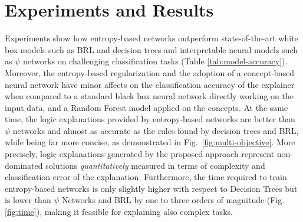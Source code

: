 \documentclass[withindex,glossary]{cam-thesis}
\theoremstyle{plain}
\theoremstyle{definition}
\theoremstyle{remark}
\begin{document}
\section{Experiments and Results}

Experiments show how entropy-based networks outperform state-of-the-art white box models such as BRL and decision trees
and interpretable neural models such as $\psi$ networks on challenging classification tasks (Table \ref{tab:model-accuracy}). 
Moreover, the entropy-based regularization and the adoption of a concept-based neural network have minor affects on the classification accuracy of the explainer when compared to
a standard black box neural network
directly working on the input data, and a Random Forest model applied on the concepts.%
At the same time, the logic explanations provided by entropy-based networks are better than $\psi$ networks and almost as accurate as the rules found by decision trees and BRL, while being far more concise, as demonstrated in Fig.~\ref{fig:multi-objective}. 
More precisely, logic explanations generated by the proposed approach represent non-dominated solutions \citep{marler2004survey} \textit{quantitatively} measured in terms of complexity and classification error of the explanation. %
Furthermore, the time required to train entropy-based networks is only slightly higher with respect to Decision Trees but is lower than $\psi$ Networks and BRL by one to three orders of magnitude (Fig. \ref{fig:time}), making it feasible for explaining also complex tasks. 
\end{document}
